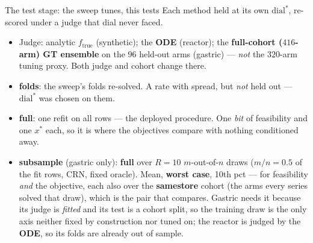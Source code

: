 \documentclass{beamer}
\begin{document}
\begin{frame}{The test stage: the sweep tunes, this tests}
  \small
  Each method held at its own $\text{dial}^\ast$, re-scored under a judge that dial
  never faced.
  \begin{itemize}
    \item Judge: analytic $f_{\text{true}}$ (synthetic); the \textbf{ODE}
      (reactor); the \textbf{full-cohort ($416$-arm) GT ensemble} on the $96$
      held-out arms (gastric) --- \emph{not} the $320$-arm tuning proxy. Both
      judge and cohort change there.
    \item \textbf{folds}: the sweep's folds re-solved. A rate with spread, but
      \emph{not} held out --- $\text{dial}^\ast$ was chosen on them.
    \item \textbf{full}: one refit on all rows --- the deployed procedure. One
      \emph{bit} of feasibility and one $x^\ast$ each, so it is where the
      objectives compare with nothing conditioned away.
    \item \textbf{subsample} (gastric only): \textbf{full} over $R{=}10$
      $m$-out-of-$n$ draws ($m/n{=}0.5$ of the fit rows, CRN, fixed oracle).
      Mean, \textbf{worst case}, 10th pct --- for feasibility \emph{and} the
      objective, each also over the \textbf{samestore} cohort (the arms every
      series solved that draw), which is the pair that compares. Gastric needs it because its judge is
      \emph{fitted} and its test is a cohort split, so the training draw is the
      only axis neither fixed by construction nor tuned on; the reactor is judged
      by the \textbf{ODE}, so its folds are already out of sample.
  \end{itemize}
\end{frame}
\end{document}
